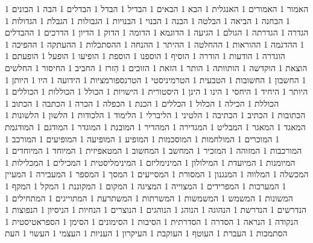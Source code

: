       1 האמור
      1 האמורים
      1 האנגלית
      1 הבא
      1 הבאים
      1 הבדיל
      1 הבדל
      1 הבדלים
      1 הבה
      1 הבונים
      1 הבחנה
      1 הביאה
      1 הבלטה
      1 הבנה
      1 הבנוי
      1 הבנויות
      1 הגבולות
      1 הגבלת
      1 הגדולות
      1 הגדרה
      1 הגדרתה
      1 הגולם
      1 הגיעה
      1 הדוגמא
      1 הדומה
      1 הדוק
      1 הדיון
      1 הדרכים
      1 ההבדלים
      1 ההדגמה
      1 ההוראות
      1 ההחלטה
      1 ההיתר
      1 ההנחה
      1 ההסתכלות
      1 ההעתקה
      1 ההפיכה
      1 הוגדרה
      1 הודעות
      1 הודרה
      1 הוסיף
      1 הוספנו
      1 הוספת
      1 הופיעו
      1 הופעל
      1 הופעתם
      1 הוצאת
      1 הוקדשה
      1 הותוותה
      1 הותר
      1 הזאת
      1 הזוכים
      1 הַזרז
      1 החביב
      1 החיסור
      1 החלשים
      1 החשבון
      1 החשובות
      1 הטבעית
      1 הטרמיניסטי
      1 הטרנספורמציות
      1 הידועה
      1 היו
      1 היותן
      1 היותר
      1 היחיד
      1 היחסי
      1 הינו
      1 הינן
      1 היסטורית
      1 הישויות
      1 הכולל
      1 הכוללות
      1 הכוללים
      1 הכוללת
      1 הכילה
      1 הכלול
      1 הכללים
      1 הכנת
      1 הכפלה
      1 הכרה
      1 הכתבה
      1 הכתוב
      1 הכתובות
      1 הכתיב
      1 הכתיבה
      1 הלטיני
      1 הליברלי
      1 הלימוד
      1 הלכודות
      1 הלשון
      1 הלשונות
      1 המאגד
      1 המאגר
      1 המבליט
      1 המגדירה
      1 המהדיר
      1 המובנת
      1 המוגדר
      1 המודגם
      1 המודגמת
      1 המוכרים
      1 המולחמות
      1 המוסכמות
      1 המופיע
      1 המופיעה
      1 המופיעים
      1 המורכב
      1 המורכבות
      1 המזוהה
      1 המזכיר
      1 המחשב
      1 המחשוב
      1 המטאפיזית
      1 המיוחד
      1 המיוחדים
      1 המיומנות
      1 המיועדת
      1 המילולון
      1 המינימליזם
      1 המינימליסטית
      1 המכילים
      1 המכלילות
      1 המכשלה
      1 המלווה
      1 המנגנון
      1 המסורת
      1 המסייעים
      1 המסך
      1 המספר
      1 המעבירה
      1 המעיין
      1 המערכות
      1 המפרידים
      1 המצוייה
      1 המציגה
      1 המקום
      1 המקוננת
      1 המקל
      1 המקף
      1 המשונות
      1 המשמש
      1 המשמשות
      1 המשרתות
      1 המשתרעת
      1 המתוייגים
      1 המתחילים
      1 הנדרשים
      1 הנדרשת
      1 הנהוגה
      1 הנוהג
      1 הנוהגים
      1 הנוצרים
      1 הנחיות
      1 הניסיון
      1 הנפוצות
      1 הנקודה
      1 הנראה
      1 הסדרה
      1 הסדרתית
      1 הסיבות
      1 הסימונים
      1 הסימן
      1 הספראטיסטית
      1 הסתמכות
      1 העברת
      1 העוטף
      1 העוקבת
      1 העיקרון
      1 העניות
      1 העצמי
      1 העשוי
      1 העת
